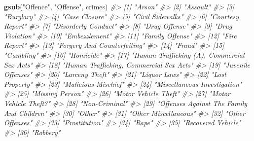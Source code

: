 \documentclass[
  12pt,
]{book}
\newenvironment{Shaded}{\begin{snugshade}}{\end{snugshade}}
\newcommand{\CommentTok}[1]{\textcolor[rgb]{0.37,0.37,0.37}{\textit{#1}}}
\newcommand{\KeywordTok}[1]{\textcolor[rgb]{0.27,0.27,0.27}{\textbf{#1}}}
\newcommand{\NormalTok}[1]{#1}
\newcommand{\StringTok}[1]{\textcolor[rgb]{0.5,0.5,0.5}{#1}}
\begin{document}
\begin{Shaded}
\begin{Highlighting}[]
\KeywordTok{gsub}\NormalTok{(}\StringTok{"Offence"}\NormalTok{, }\StringTok{"Offense"}\NormalTok{, crimes)}
\CommentTok{\#>  [1] "Arson"                                     }
\CommentTok{\#>  [2] "Assault"                                   }
\CommentTok{\#>  [3] "Burglary"                                  }
\CommentTok{\#>  [4] "Case Closure"                              }
\CommentTok{\#>  [5] "Civil Sidewalks"                           }
\CommentTok{\#>  [6] "Courtesy Report"                           }
\CommentTok{\#>  [7] "Disorderly Conduct"                        }
\CommentTok{\#>  [8] "Drug Offense"                              }
\CommentTok{\#>  [9] "Drug Violation"                            }
\CommentTok{\#> [10] "Embezzlement"                              }
\CommentTok{\#> [11] "Family Offense"                            }
\CommentTok{\#> [12] "Fire Report"                               }
\CommentTok{\#> [13] "Forgery And Counterfeiting"                }
\CommentTok{\#> [14] "Fraud"                                     }
\CommentTok{\#> [15] "Gambling"                                  }
\CommentTok{\#> [16] "Homicide"                                  }
\CommentTok{\#> [17] "Human Trafficking (A), Commercial Sex Acts"}
\CommentTok{\#> [18] "Human Trafficking, Commercial Sex Acts"    }
\CommentTok{\#> [19] "Juvenile Offenses"                         }
\CommentTok{\#> [20] "Larceny Theft"                             }
\CommentTok{\#> [21] "Liquor Laws"                               }
\CommentTok{\#> [22] "Lost Property"                             }
\CommentTok{\#> [23] "Malicious Mischief"                        }
\CommentTok{\#> [24] "Miscellaneous Investigation"               }
\CommentTok{\#> [25] "Missing Person"                            }
\CommentTok{\#> [26] "Motor Vehicle Theft"                       }
\CommentTok{\#> [27] "Motor Vehicle Theft?"                      }
\CommentTok{\#> [28] "Non{-}Criminal"                              }
\CommentTok{\#> [29] "Offenses Against The Family And Children"  }
\CommentTok{\#> [30] "Other"                                     }
\CommentTok{\#> [31] "Other Miscellaneous"                       }
\CommentTok{\#> [32] "Other Offenses"                            }
\CommentTok{\#> [33] "Prostitution"                              }
\CommentTok{\#> [34] "Rape"                                      }
\CommentTok{\#> [35] "Recovered Vehicle"                         }
\CommentTok{\#> [36] "Robbery"                                   }

\end{Highlighting}
\end{Shaded}
\end{document}

